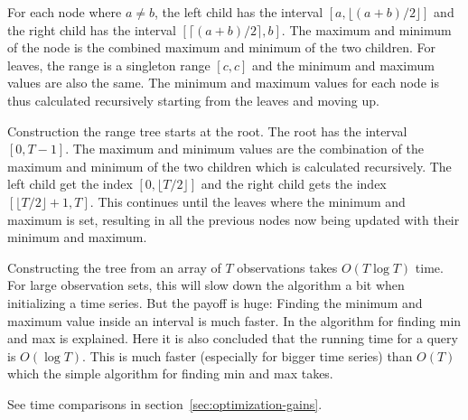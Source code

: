 For each node where $a \neq b$, the left child has the interval $[a, \lfloor
(a+b)/2 \rfloor]$ and the right child has the interval $[\lceil
(a+b)/2 \rceil, b]$. The maximum and minimum of the node is the combined maximum
and minimum of the two children. For leaves, the range is a singleton range
$[c,c]$ and the minimum and maximum values are also the same. The minimum and
maximum values for each node is thus calculated recursively starting from the
leaves and moving up. 

Construction the range tree starts at the root. The root has the interval
$[0,T-1]$. The maximum and minimum values are the combination of the maximum and
minimum of the two children which is calculated recursively. The left child get
the index $[0, \lfloor T/2 \rfloor]$ and the right child gets the index $[\lfloor
T/2 \rfloor + 1, T ]$. This
continues until the leaves where the minimum and maximum is set, resulting in
all the previous nodes now being updated with their minimum and maximum. 

Constructing the tree from an array of $T$ observations takes 
$O(T \log T)$ time. For large observation sets, this will slow down the
algorithm a bit when initializing a time series. But the payoff is huge: Finding
the minimum and maximum value inside an interval is much faster. In
\cite{compstat14} the algorithm for finding min and max is explained. Here it is
also concluded that the running time for a query is $O(\log T)$. This is much
faster (especially for bigger time series) than $O(T)$ which the simple
algorithm for finding min and max takes. 

See time comparisons in section~\ref{sec:optimization-gains}. 